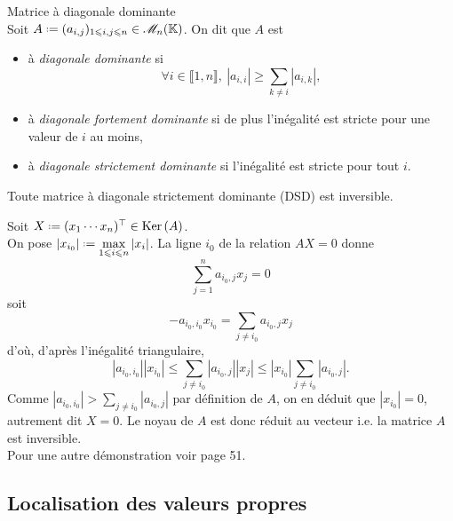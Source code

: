 \begin{defi}{Matrice à diagonale dominante} 
    \\
    Soit $A \defeq (a_{i,j})_{1 \leqslant i, j \leqslant n} \in \M_n(\K)$. On dit que $A$ est 
    \begin{itemize}
        \item à \emph{diagonale dominante} si
        $$\forall i \in \llbracket 1, n \rrbracket,\ |a_{i,i}| \geqslant \sum_{k \not = i} |a_{i,k}|,$$
        \item à \emph{diagonale fortement dominante} si de plus l'inégalité est stricte pour une valeur de $i$ au moins,
        \item à \emph{diagonale strictement dominante} si l'inégalité est stricte pour tout $i$. 
    \end{itemize}
\end{defi}

\begin{lemme} \label{lemme_hadamard}
    Toute matrice à diagonale strictement dominante (DSD) est inversible.
\end{lemme}


\begin{preuve}
    Soit $X \defeq \Trsp{(x_1 \cdots x_n)} \in \Ker(A)$. \\
    On pose $\displaystyle \left |x_{i_0} \right| \defeq \max_{1 \leqslant i \leqslant n} |x_i|$. La ligne $i_0$ de la relation $AX = 0$ donne
    $$\sum_{j=1}^n a_{i_0,j}x_j = 0$$
    soit
    $$-a_{i_0, i_0} x_{i_0} = \sum_{j \not = i_0} a_{i_0,j} x_j$$
    d'où, d'après l'inégalité triangulaire,
    $$|a_{i_0, i_0}| |x_{i_0}| \leqslant \sum_{j \not = i_0} |a_{i_0,j}| |x_j| \leqslant |x_{i_0}| \sum_{j \not = i_0} |a_{i_0, j}|.$$
    Comme $|a_{i_0, i_0}| > \sum\limits_{j \not = i_0} |a_{i_0, j}|$ par définition de $A$, on en déduit que
    $|x_{i_0}| = 0$, autrement dit $X = 0$. Le noyau de $A$ est donc réduit au vecteur i.e. la matrice $A$ est inversible. \\
    Pour une autre démonstration voir \cite{matrices} page 51. 
\end{preuve}

\subsection{Localisation des valeurs propres}

